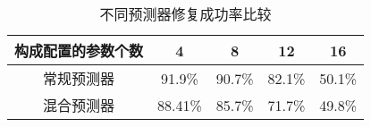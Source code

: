 \begin{table}[ht]
\caption{不同预测器修复成功率比较}
\label{tab:cmp_predictor_unstable}
\centering
\begin{threeparttable}
\begin{tabular}{c|cccc}
        \toprule[1.5pt]
        {构成配置的参数个数} & {4} & {8} & {12} & {16}  \\
        \midrule[0.8pt]
       {常规预测器} & 91.9\% & 90.7\% & 82.1\% & 50.1\% \\
       {混合预测器} & 88.41\% & 85.7\% & 71.7\% & 49.8\% \\
        \bottomrule[1.5pt]
\end{tabular}
\end{threeparttable}
\end{table}